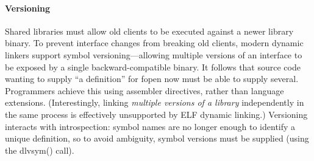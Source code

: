 
\paragraph{Versioning} 
Shared libraries must allow old clients to be executed against a newer
library binary.
To prevent interface changes from breaking old clients, 
modern dynamic linkers support symbol versioning---allowing
multiple versions of an interface to be exposed by a single
backward-compatible binary.
It follows that source code wanting to supply ``a definition''
for \textsf{fopen} now must be able to supply several.
Programmers achieve this using assembler directives, 
rather than language extensions.
(Interestingly, linking \emph{multiple versions of a library} independently
in the same process is effectively unsupported by ELF dynamic linking.)
Versioning interacts with introspection: symbol names
are no longer enough to identify a unique definition,
so to avoid ambiguity, symbol versions must be supplied (using the \textsf{dlvsym()} call).


